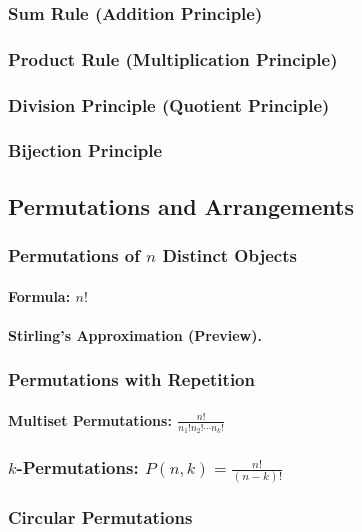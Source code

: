 \subsubsection{Sum Rule (Addition Principle)}
\subsubsection{Product Rule (Multiplication Principle)}
\subsubsection{Division Principle (Quotient Principle)}
\subsubsection{Bijection Principle}

\subsection{Permutations and Arrangements}
\label{subsec:permutations}

\subsubsection{Permutations of $n$ Distinct Objects}
\paragraph{Formula: $n!$}
\paragraph{Stirling's Approximation (Preview).}

\subsubsection{Permutations with Repetition}
\paragraph{Multiset Permutations: $\frac{n!}{n_1! n_2! \cdots n_k!}$}

\subsubsection{$k$-Permutations: $P(n,k) = \frac{n!}{(n-k)!}$}

\subsubsection{Circular Permutations}
